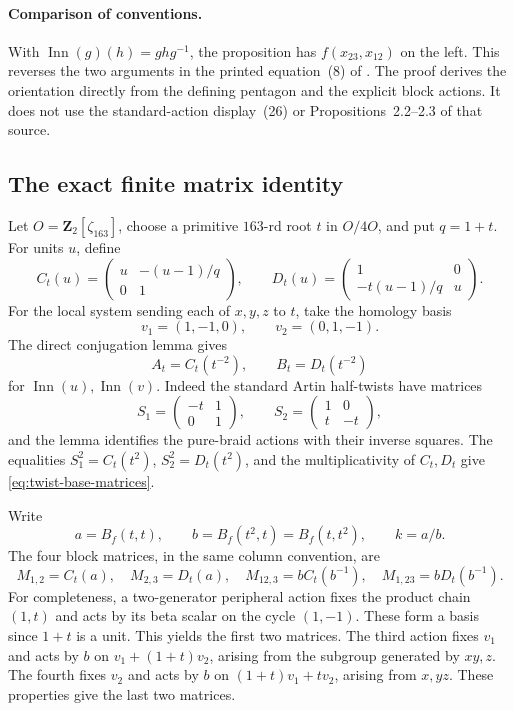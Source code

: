 \paragraph{Comparison of conventions.}
With \(\operatorname{Inn}(g)(h)=ghg^{-1}\), the proposition
has \(f(x_{23},x_{12})\) on the left. This reverses the two
arguments in the printed equation~(8) of \cite{LS2015Twists}.
The proof derives the orientation directly from the defining
pentagon and the explicit block actions. It does not use the
standard-action display~(26) or Propositions~2.2--2.3 of that
source.

\subsection{The exact finite matrix identity}

Let \(O=\mathbf Z_2[\zeta_{163}]\), choose a primitive
\(163\)-rd root \(t\) in \(O/4O\), and put \(q=1+t\).
For units \(u\), define
\[
 C_t(u)=\begin{pmatrix}u&-(u-1)/q\\0&1\end{pmatrix},\qquad
 D_t(u)=\begin{pmatrix}1&0\\-t(u-1)/q&u\end{pmatrix}.
\]
For the local system sending each of \(x,y,z\) to \(t\),
take the homology basis
\[
 v_1=(1,-1,0),\qquad v_2=(0,1,-1).
\]
The direct conjugation lemma gives
\begin{equation}
 A_t=C_t(t^{-2}),\qquad B_t=D_t(t^{-2})                \label{eq:twist-base-matrices}
\end{equation}
for \(\operatorname{Inn}(u),\operatorname{Inn}(v)\).
Indeed the standard Artin half-twists have matrices
\[
 S_1=\begin{pmatrix}-t&1\\0&1\end{pmatrix},\qquad
 S_2=\begin{pmatrix}1&0\\t&-t\end{pmatrix},
\]
and the lemma identifies the pure-braid actions with their inverse
squares. The equalities \(S_1^2=C_t(t^2)\),
\(S_2^2=D_t(t^2)\), and the multiplicativity of \(C_t,D_t\)
give \eqref{eq:twist-base-matrices}.

Write
\[
 a=B_f(t,t),\qquad b=B_f(t^2,t)=B_f(t,t^2),\qquad k=a/b.
\]
The four block matrices, in the same column convention, are
\[
 M_{1,2}=C_t(a),\quad M_{2,3}=D_t(a),\quad
 M_{12,3}=bC_t(b^{-1}),\quad
 M_{1,23}=bD_t(b^{-1}).
\]
For completeness, a two-generator peripheral action fixes the product
chain \((1,t)\) and acts by its beta scalar on the cycle
\((1,-1)\). These form a basis since \(1+t\) is a unit.
This yields the first two matrices. The third action fixes \(v_1\)
and acts by \(b\) on \(v_1+(1+t)v_2\), arising from the
subgroup generated by \(xy,z\). The fourth fixes \(v_2\)
and acts by \(b\) on \((1+t)v_1+t v_2\), arising from
\(x,yz\). These properties give the last two matrices.

